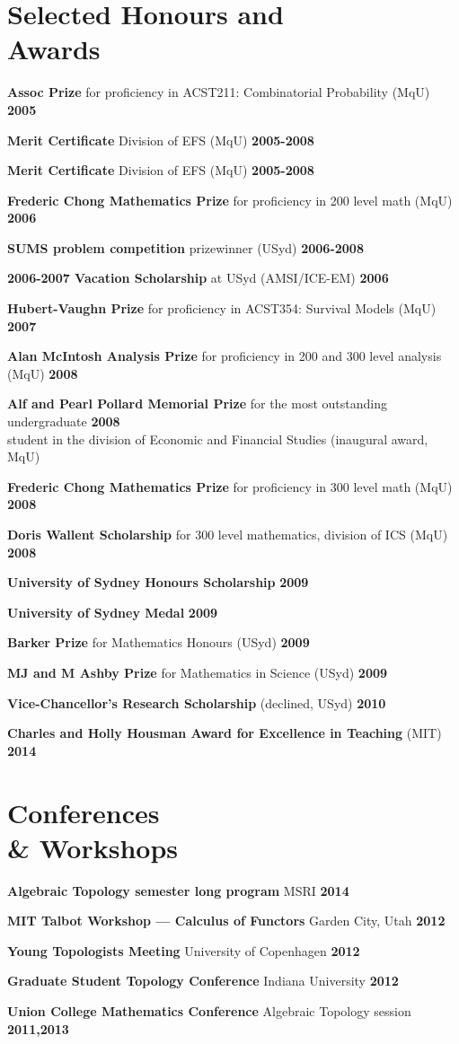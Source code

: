 \documentclass[margin,line]{resume}
\begin{document}
\begin{resume}
\vspace{2mm}

    \section{\mysidestyle Selected Honours and\\Awards} 
           

\newcommand{\award}[3]{\textbf{#1} #2 \hfill \textbf{#3}
           
\vspace{-2.5mm}}
\newcommand{\twolineaward}[4]{\textbf{#1} #2 \hfill \textbf{#4}\\%
#3
           
\vspace{-2.5mm}}

\award{Assoc Prize}{for proficiency in ACST211: Combinatorial Probability (MqU)}{2005}
\award{Merit Certificate}{Division of EFS (MqU)}{2005-2008}
\award{Merit Certificate}{Division of EFS (MqU)}{2005-2008}
\award{Frederic Chong Mathematics Prize}{for proficiency in 200 level math (MqU)}{2006}
\award{SUMS problem competition}{prizewinner (USyd)}{2006-2008}
\award{2006-2007 Vacation Scholarship}{at USyd (AMSI/ICE-EM)}{2006}
\award{Hubert-Vaughn Prize}{for proficiency in ACST354: Survival Models (MqU)}{2007}
\award{Alan McIntosh Analysis Prize}{for proficiency in 200 and 300 level analysis (MqU)}{2008}
\twolineaward{Alf and Pearl Pollard Memorial Prize}{for the most outstanding undergraduate}{student in the division of Economic and Financial Studies (inaugural award, MqU)}{2008}
\award{Frederic Chong Mathematics Prize}{for proficiency in 300 level math (MqU)}{2008}
\award{Doris Wallent Scholarship}{for 300 level mathematics, division of ICS (MqU)}{2008}
\award{University of Sydney Honours Scholarship}{}{2009}
\award{University of Sydney Medal}{}{2009}
\award{Barker Prize}{for Mathematics Honours (USyd)}{2009}
\award{MJ and M Ashby Prize}{for Mathematics in Science (USyd)}{2009}
\award{Vice-Chancellor's Research Scholarship}{(declined, USyd)}{2010}
\award{Charles and Holly Housman Award for Excellence in Teaching}{(MIT)}{2014}



    \section{\mysidestyle Conferences \\ \& Workshops}

\award{Algebraic Topology semester long program}{MSRI}{2014}
\award{MIT Talbot Workshop --- Calculus of Functors}{Garden City, Utah}{2012}
\award{Young Topologists Meeting}{University of Copenhagen}{2012}
\award{Graduate Student Topology Conference}{Indiana University}{2012}
\award{Union College Mathematics Conference}{Algebraic Topology session}{2011,2013}


\end{resume}
\end{document}

